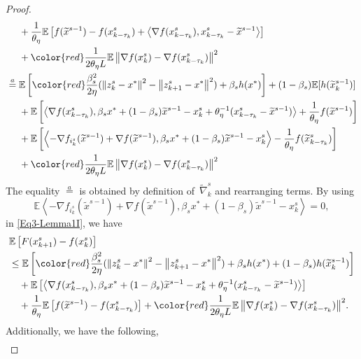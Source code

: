\documentclass[10pt, conference, compsocconf]{IEEEtran}
\newcommand*{\E}{\mathbb{E}}
\newcommand*{\VRG}{\,\widetilde{\nabla}_k^s}
\newcommand{\norm}[1]{\left\lVert#1\right\rVert}
\newcommand{\Iprod}[2]{\left\langle #1,#2\right\rangle}
\theoremstyle{definition}
\theoremstyle{remark}
\begin{document}
\begin{proof}
\begin{equation}
\begin{split}
&~~~~+\frac{1}{\theta_{\eta}}\E\left[f(\widetilde{x}^{s-1})-f(x_{k-\tau_k}^s)+\Iprod{\nabla f(x_{k-\tau_k}^s)}{x_{k-\tau_k}^s-\widetilde{x}^{s-1}}\right]\\
&~~~~+{\color{red}\frac{1}{2 \theta_{\eta} L} \E\norm{\nabla f(x_{k}^s)-\nabla f(x_{k-\tau_k}^s)}^2}\\
& \stackrel{a}{=} \E\left[{\color{red}\frac{ \beta_s^2}{2\eta}}(\norm{z_{k}^s-x^*}^2-\norm{z_{k+1}^s-x^*}^2)+\beta_sh(x^*)\right]+(1-\beta_s) \E[h(\widetilde{x}_k^{s-1})]\\
&~~~~+\E\left[\Iprod{\nabla f(x_{k-\tau_k}^s)}{\beta_sx^*+(1-\beta_s)\widetilde{x}^{s-1}-{x}^{s}_{k}+\theta_{\eta}^{-1}(x_{k-\tau_k}^s-\widetilde{x}^{s-1})}+\frac{1}{\theta_{\eta}}f(\widetilde{x}^{s-1})\right]\\
&~~~~+\E\left[\Iprod{-\nabla f_{i_k^s}(\widetilde{x}^{s-1})+\nabla f(\widetilde{x}^{s-1})}{\beta_sx^*+(1-\beta_s)\widetilde{x}^{s-1}-x_{k}^{s}}-\frac{1}{\theta_{\eta}}f(\widetilde{x}^{s}_{k-\tau_k})\right]\\
&~~~~+{\color{red}\frac{1}{2 \theta_{\eta} L} \E\norm{\nabla f(x_{k}^s)-\nabla f(x_{k-\tau_k}^s)}^2}
\end{split}
\end{equation}
The equality $\stackrel{a}{=}$ is obtained by definition of $\VRG$ and rearranging terms. By using    
\[
\E\Iprod{-\nabla f_{i_k^s}(\widetilde{x}^{s-1})+\nabla f(\widetilde{x}^{s-1})}{\beta_sx^*+(1-\beta_s)\widetilde{x}^{s-1}-x_{k}^{s}}=0,
\]
in \eqref{Eq3-Lemma1I}, we have
\begin{equation}\label{Eq3-Lemma1}
\begin{split}
&\E\left[F(x_{k+1}^s) -f(x_{k}^s)\right]\\
&\leq\E\left[{\color{red}\frac{ \beta_s^2}{2\eta}}(\norm{z_{k}^s-x^*}^2-\norm{z_{k+1}^s-x^*}^2)+\beta_sh(x^*)+(1-\beta_s) h(\widetilde{x}_k^{s-1})\right]\\
&~~~+\E\left[\Iprod{\nabla f(x_{k-\tau_k}^s)}{\beta_sx^*+(1-\beta_s)\widetilde{x}^{s-1}-{x}^{s}_{k}+\theta_{\eta}^{-1}(x_{k-\tau_k}^s-\widetilde{x}^{s-1})}\right]\\
&~~~+\frac{1}{\theta_{\eta}}\E\left[f(\widetilde{x}^{s-1})-f({x}_{k-\tau_k}^{s})\right]+{\color{red}\frac{1}{2 \theta_{\eta} L} \E\norm{\nabla f(x_{k}^s)-\nabla f(x_{k-\tau_k}^s)}^2}.
\end{split}
\end{equation}
Additionally, we have the following,
\begin{equation}\label{Eq4-Lemma1}
\begin{split}

\end{split}
\end{equation}
\end{proof}
\end{document}
